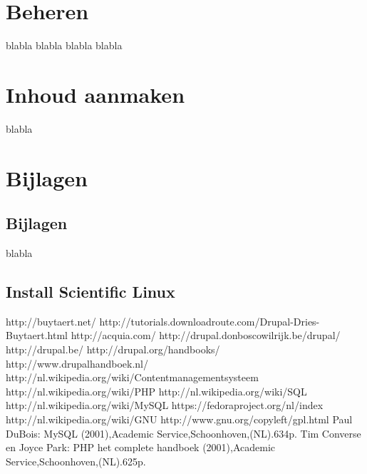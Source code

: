\documentclass[11pt,twoside,onecolumn,titlepage,openbib]{book}
\begin{document}
\part{Beheren}
 blabla
%  
blabla
%  
blabla
%  
blabla
%  

\part{Inhoud aanmaken}
% 
blabla

\part{Bijlagen}

\chapter{Bijlagen}
% 
blabla
\chapter{Install Scientific Linux}
% 

\begin{thebibliography}{99}
http://buytaert.net/
http://tutorials.downloadroute.com/Drupal-Dries-Buytaert.html
http://acquia.com/  http://drupal.donboscowilrijk.be/drupal/
 http://drupal.be/
 http://drupal.org/handbooks/
 http://www.drupalhandboek.nl/
 http://nl.wikipedia.org/wiki/Contentmanagementsysteem
 http://nl.wikipedia.org/wiki/PHP
 http://nl.wikipedia.org/wiki/SQL
 http://nl.wikipedia.org/wiki/MySQL
 https://fedoraproject.org/nl/index
 http://nl.wikipedia.org/wiki/GNU
 http://www.gnu.org/copyleft/gpl.html
 Paul DuBois: MySQL (2001),Academic Service,Schoonhoven,(NL).634p.
 Tim Converse en Joyce Park: PHP het complete handboek (2001),Academic Service,Schoonhoven,(NL).625p.
\end{thebibliography}
\printindex
\end{document}
